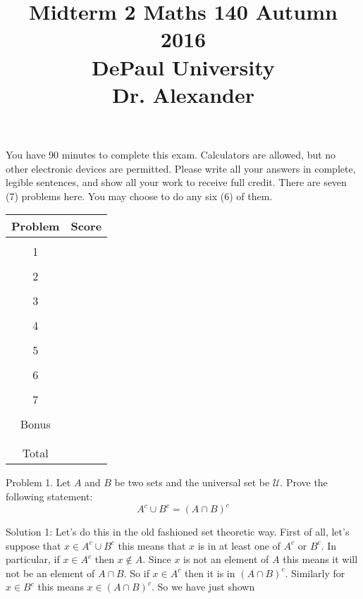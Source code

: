 \documentclass[16 pt]{amsart}
\theoremstyle{definition}
\theoremstyle{remark}
\numberwithin{equation}{subsection}
\begin{document}
\title{Midterm 2 Maths 140 Autumn 2016 \\ DePaul University\\Dr. Alexander}
\maketitle
You have 90 minutes to complete this exam.  Calculators are allowed, but no other electronic devices are permitted.  Please write all your answers in complete, legible sentences, and show all your work to receive full credit.  There are seven (7) problems here.  You may choose to do any six (6) of them.  
\vspace{1in}


\begin{center}
  \begin{tabular}{ c | c }
    Problem & Score\\
    \hline
    &\\
    1&\\
    &\\
    2&\\
    &\\
    3&\\
    &\\
    4&\\
    &\\
    5&\\
    &\\
    6&\\
    &\\
    7&\\
    &\\
    Bonus&\\
    &\\
    \hline 
    &\\    
    Total& 
 \end{tabular}
\end{center}

\newpage 
Problem 1. Let $A$ and $B$ be two sets and the universal set be $\mathcal{U}$.  Prove the following statement:
\[
A^c \cup B^c = (A\cap B)^c
\]

\vspace{1in}

Solution 1: Let's do this in the old fashioned set theoretic way.  First of all, let's suppose that $x\in A^c \cup B^c$ this means that $x$ is in at least one of $A^c$ or $B^c$.  In particular, if $x\in A^c$ then $x\notin A$.  Since $x$ is not an element of $A$ this means it will not be an element of $A\cap B$.  So if $x\in A^c$ then it is in $(A\cap B)^c$.  Similarly for $x\in B^c$ this means $x\in (A\cap B)^c$.  So we have just shown
\end{document}
